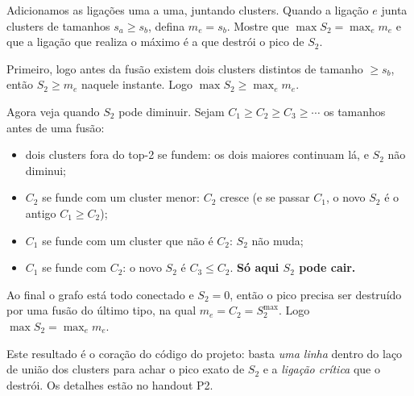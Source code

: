 \documentclass[11pt]{article}
\begin{document}
\begin{exemplo}
Adicionamos as ligações uma a uma, juntando clusters. Quando a ligação $e$ junta clusters de tamanhos $s_a\ge s_b$, defina $m_e = s_b$. Mostre que $\max S_2 = \max_e m_e$ e que a ligação que realiza o máximo é a que destrói o pico de $S_2$.
\end{exemplo}
\begin{solucao}
Primeiro, logo antes da fusão existem dois clusters distintos de tamanho $\ge s_b$, então $S_2\ge m_e$ naquele instante. Logo $\max S_2 \ge \max_e m_e$.

Agora veja quando $S_2$ pode diminuir. Sejam $C_1\ge C_2\ge C_3\ge\cdots$ os tamanhos antes de uma fusão:
\begin{itemize}
  \item dois clusters fora do top-2 se fundem: os dois maiores continuam lá, e $S_2$ não diminui;
  \item $C_2$ se funde com um cluster menor: $C_2$ cresce (e se passar $C_1$, o novo $S_2$ é o antigo $C_1\ge C_2$);
  \item $C_1$ se funde com um cluster que não é $C_2$: $S_2$ não muda;
  \item $C_1$ se funde com $C_2$: o novo $S_2$ é $C_3\le C_2$. \textbf{Só aqui $S_2$ pode cair.}
\end{itemize}
Ao final o grafo está todo conectado e $S_2=0$, então o pico precisa ser destruído por uma fusão do último tipo, na qual $m_e = C_2 = S_2^{\max}$. Logo $\max S_2 = \max_e m_e$.
\end{solucao}

Este resultado é o coração do código do projeto: basta \emph{uma linha} dentro do laço de união dos clusters para achar o pico exato de $S_2$ e a \emph{ligação crítica} que o destrói. Os detalhes estão no handout P2.
\end{document}
